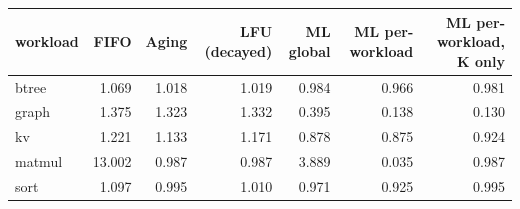 \begin{tabular}{lrrrrrr}
\toprule
workload & FIFO & Aging & LFU (decayed) & ML global & ML per-workload & ML per-workload, K only \\
\midrule
btree & 1.069 & 1.018 & 1.019 & 0.984 & 0.966 & 0.981 \\
graph & 1.375 & 1.323 & 1.332 & 0.395 & 0.138 & 0.130 \\
kv & 1.221 & 1.133 & 1.171 & 0.878 & 0.875 & 0.924 \\
matmul & 13.002 & 0.987 & 0.987 & 3.889 & 0.035 & 0.987 \\
sort & 1.097 & 0.995 & 1.010 & 0.971 & 0.925 & 0.995 \\
\bottomrule
\end{tabular}
